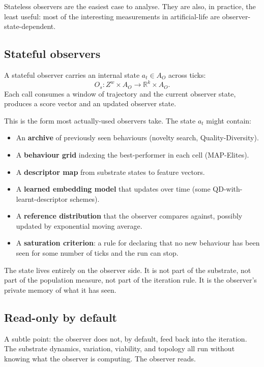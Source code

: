 Stateless observers are the easiest case to analyse. They are also,
in practice, the least useful: most of the interesting measurements
in artificial-life are observer-state-dependent.

\subsection*{Stateful observers}

A stateful observer carries an internal state $a_t \in A_O$ across
ticks:
\[
  O_s : Z^w \times A_O \to \mathbb{R}^k \times A_O.
\]
Each call consumes a window of trajectory and the current observer
state, produces a score vector and an updated observer state.

This is the form most actually-used observers take. The state $a_t$
might contain:

\begin{itemize}[leftmargin=1.5em,itemsep=2pt]
  \item An \textbf{archive} of previously seen behaviours (novelty
    search, Quality-Diversity).
  \item A \textbf{behaviour grid} indexing the best-performer in each
    cell (MAP-Elites).
  \item A \textbf{descriptor map} from substrate states to feature
    vectors.
  \item A \textbf{learned embedding model} that updates over time
    (some QD-with-learnt-descriptor schemes).
  \item A \textbf{reference distribution} that the observer compares
    against, possibly updated by exponential moving average.
  \item A \textbf{saturation criterion}: a rule for declaring that no
    new behaviour has been seen for some number of ticks and the run
    can stop.
\end{itemize}

The state lives entirely on the observer side. It is not part of the
substrate, not part of the population measure, not part of the
iteration rule. It is the observer's private memory of what it has
seen.

\subsection*{Read-only by default}

A subtle point: the observer does not, by default, feed back into the
iteration. The substrate dynamics, variation, viability, and topology
all run without knowing what the observer is computing. The observer
reads.

